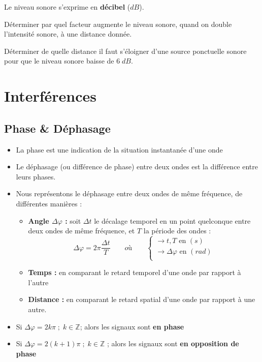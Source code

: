 \documentclass[11pt,a4paper]{article}
\begin{document}
Le niveau sonore s’exprime en \textbf{décibel} ($dB$).

\endgroup
\vspace{1.5cm}
\begin{exo}
Déterminer par quel facteur augmente le niveau sonore, quand on double l'intensité sonore, à une distance donnée. 
\vspace{4cm}
\end{exo}

\begin{exo}
Déterminer de quelle distance il faut s'éloigner d'une source ponctuelle sonore pour que le niveau sonore baisse de $6\;dB$. 
\vspace{4cm}
\end{exo}

\section{Interférences}

\subsection{Phase \& Déphasage}
\begin{itemize}
    \item La phase est une indication de la situation instantanée d’une onde
    \item Le déphasage (ou différence de phase) entre deux ondes est la différence entre leurs phases. 
    \item Nous représentons le déphasage entre deux ondes de même fréquence, de différentes manières :
    \begin{itemize}
        \item \textbf{Angle $\Delta \varphi$ :} soit $\Delta t$ le décalage temporel en un point quelconque entre deux ondes de même fréquence, et $T$ la période des ondes :
        \[  \Delta \varphi = 2\pi\dfrac{\Delta t}{T}  \quad\quad où \quad\quad  
            \begin{cases}
            \rightarrow t, T\text{ en }(s) \\
            \rightarrow \Delta \varphi\text{ en }(rad) \\ 
             \end{cases}
        \]
        \item \textbf{Temps :  }en comparant le retard temporel d’une onde par rapport à l’autre
        \item \textbf{Distance : }en comparant le retard spatial d’une onde par rapport à une autre.
    \end{itemize}
    \item Si $\Delta \varphi = 2k\pi \; ; \; k\in \mathbb{Z}$; alors les signaux sont \textbf{en phase} 
    \item Si $\Delta \varphi = 2(k+1)\pi \; ; \; k\in \mathbb{Z}$ ; alors les signaux sont \textbf{en opposition de phase} 
\end{itemize}
\end{document}
